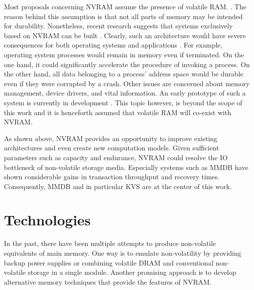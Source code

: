 Most proposals concerning NVRAM assume the presence of volatile RAM.
\cite{oukid2017data}. The reason behind this assumption is that not all parts of
memory may be intended for durability. Nonetheless, recent research suggests
that systems exclusively based on NVRAM can be built \cite{narayanan2012whole,
courtland2016can}. Clearly, such an architecture would have severe consequences
for both operating systems and applications \cite{bailey2011operating}. For
example, operating system processes would remain in memory even if terminated.
On the one hand, it could significantly accelerate the procedure of invoking a
process. On the other hand, all data belonging to a process' address space would
be durable even if they were corrupted by a crash. Other issues are concerned
about memory management, device drivers, and vital information. An early
prototype of such a system is currently in development \cite{courtland2016can}.
This topic however, is beyond the scope of this work and it is henceforth
assumed that volatile RAM will co-exist with NVRAM.

As shown above, NVRAM provides an opportunity to improve existing architectures
and even create new computation models. Given sufficient parameters such as
capacity and endurance, NVRAM could resolve the IO bottleneck of non-volatile
storage media. Especially systems such as MMDB have shown considerable gains in
transaction throughput and recovery times. Consequently, MMDB and in particular
KVS are at the center of this work.

\section{Technologies}

In the past, there have been multiple attempts to produce non-volatile
equivalents of main memory. One way is to emulate non-volatility by providing
backup power supplies or combining volatile DRAM and conventional non-volatile
storage in a single module. Another promising approach is to develop alternative
memory techniques that provide the features of NVRAM.



